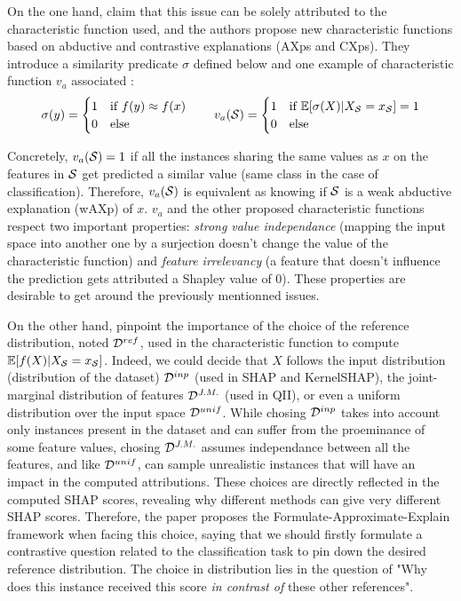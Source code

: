 On the one hand, \textcite{letoffe_towards_2025} claim that this issue can be solely attributed to the characteristic 
function used, and the authors propose new characteristic functions based on abductive and contrastive explanations 
(AXps and CXps). They introduce a similarity predicate $\sigma$ defined below and one example of characteristic 
function $v_a$ associated :
\begin{equation}
    \sigma(y) = \begin{cases}
        1 & \text{if} ~ f(y) \approx f(x) \\
        0 & \text{else}
    \end{cases}
    \qquad
    v_a(\mathcal{S}) = \begin{cases}
        1 & \text{if} ~ \mathbb{E}[\sigma(X) | X_{\mathcal{S}} = x_{\mathcal{S}}] = 1 \\
        0 & \text{else}
    \end{cases}    
\end{equation}

Concretely, $v_a(\mathcal{S}) = 1$ if all the instances sharing the same values as $x$ on the features in $\mathcal{S}$ get 
predicted a similar value (same class in the case of classification). Therefore, $v_a(\mathcal{S})$ is equivalent as 
knowing if $\mathcal{S}$ is a weak abductive explanation (wAXp) of $x$. $v_a$ and the other proposed characteristic 
functions respect two important properties: \textit{strong value independance} (mapping the input space into 
another one by a surjection doesn't change the value of the characteristic function) and \textit{feature irrelevancy} 
(a feature that doesn't influence the prediction gets attributed a Shapley value of $0$). These properties are 
desirable to get around the previously mentionned issues.

On the other hand, \textcite{merrick_explanation_2020} pinpoint the importance of the choice of the reference distribution, 
noted $\mathcal{D}^{ref}$, used in the characteristic function to compute $\mathbb{E}[f(X)|X_{\mathcal{S}} = x_{\mathcal{S}}]$. Indeed, we 
could decide that $X$ follows the input distribution (distribution of the dataset) $\mathcal{D}^{inp}$ (used in SHAP 
and KernelSHAP), the joint-marginal distribution of features $\mathcal{D}^{J.M.}$ (used in QII), or even a uniform 
distribution over the input space $\mathcal{D}^{unif}$. While chosing $\mathcal{D}^{inp}$ takes into account only instances 
present in the dataset and can suffer from the proeminance of some feature values, chosing $\mathcal{D}^{J.M.}$ assumes independance between all the features, and like $\mathcal{D}^{unif}$, 
can sample unrealistic instances that will have an impact in the computed attributions. These choices are directly reflected in the computed SHAP scores, revealing why different methods can give very different SHAP scores. Therefore, the paper 
proposes the Formulate-Approximate-Explain framework when facing this choice, saying that we should firstly 
formulate a contrastive question related to the classification task to pin down the desired reference distribution. 
The choice in distribution lies in the question of "Why does this instance received this score 
\textit{in contrast of} these other references".

